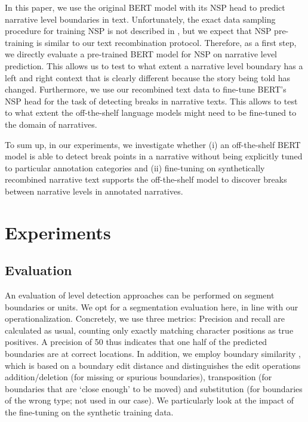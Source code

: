 \documentclass[10pt, a4paper]{article}
\begin{document}
In this paper, we use the original BERT model with its NSP head to predict narrative level boundaries in text.
Unfortunately, the exact data sampling procedure for training NSP is not described in \cite{devlin_bert_2019}, but we expect that NSP pre-training is similar to our text recombination protocol. 
Therefore, as a first step, we directly evaluate a pre-trained BERT model for NSP on narrative level prediction.
This allows us to test to what extent a narrative level boundary has a left and right context that is clearly different because the story being told has changed.
Furthermore, we use our recombined text data to fine-tune BERT's NSP head for the task of detecting breaks in narrative texts.
This allows to test to what extent the off-the-shelf language models might need to be fine-tuned to the domain of narratives.

To sum up, in our experiments, we investigate whether (i) an off-the-shelf BERT model is able to detect break points in a narrative without being explicitly tuned to particular annotation categories and (ii) fine-tuning on synthetically recombined narrative text supports the off-the-shelf model to discover breaks between narrative levels in annotated narratives.

\section{Experiments}
\label{sec:experiments}

\subsection{Evaluation}
\label{sec:operationalisation}


An evaluation of level detection approaches can be performed on segment boundaries or units. We opt for a segmentation evaluation here, in line with our operationalization. Concretely, we use three metrics: Precision and recall are calculated as usual, counting only exactly matching character positions as true positives. A precision of 50 thus indicates that one half of the predicted boundaries are at correct locations. In addition, we employ boundary similarity \cite{fournier-2013-evaluating}, which is based on a boundary edit distance and distinguishes the edit operations addition/deletion (for missing or spurious boundaries), transposition (for boundaries that are \enquote*{close enough} to be moved) and substitution (for boundaries of the wrong type; not used in our case). We particularly look at the impact of the fine-tuning on the synthetic training data.
\end{document}

